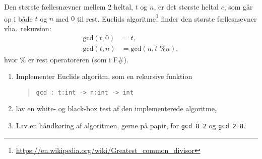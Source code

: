 \label{gcd} Den største fællesnævner mellem 2 heltal, $t$ og $n$, er det største heltal $c$, som går op i både $t$ og $n$ med $0$ til rest. Euclids algoritme\footnote{\url{https://en.wikipedia.org/wiki/Greatest_common_divisor}} finder den største fællesnævner vha.\ rekursion:
  \begin{align}
    \text{gcd}(t,0) &= t, \label{gcd:1}
    \\ \text{gcd}(t,n) &= \text{gcd}(n, t \text{ \% } n), \label{gcd:2}
  \end{align}
hvor $\%$ er rest operatoreren (som i F\#). 
\begin{enumerate}
\item Implementer Euclids algoritm, som en rekursive funktion
  \begin{quote}
    \lstinline{gcd : t:int -> n:int -> int}
  \end{quote}
\item lav en white- og black-box test af den implementerede algoritme,
\item Lav en håndkøring af algoritmen, gerne på papir, for \lstinline{gcd 8 2} og \lstinline{gcd 2 8}.
\end{enumerate}

